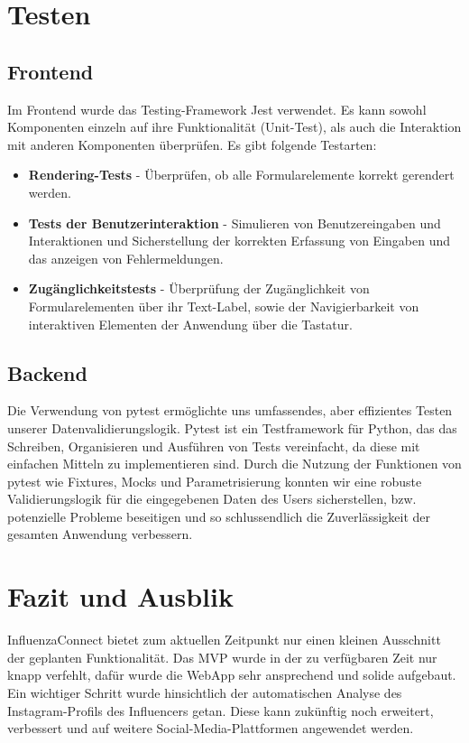\documentclass[conference,a4paper,flushend]{cs-techrep}
\begin{document}
\section{Testen}
\subsection{Frontend}
Im Frontend wurde das Testing-Framework Jest \cite{jest} verwendet. Es kann sowohl Komponenten einzeln auf ihre Funktionalität (Unit-Test), als auch die Interaktion mit anderen Komponenten überprüfen. Es gibt folgende Testarten:

\begin{itemize}
	\item{\textbf{Rendering-Tests} - Überprüfen, ob alle Formularelemente korrekt gerendert werden.}
	\item{\textbf{Tests der Benutzerinteraktion} - Simulieren von Benutzereingaben und Interaktionen und Sicherstellung der korrekten Erfassung von Eingaben und das anzeigen von Fehlermeldungen.}
	\item{\textbf{Zugänglichkeitstests} - Überprüfung der Zugänglichkeit von Formularelementen über ihr Text-Label, sowie der Navigierbarkeit von interaktiven Elementen der Anwendung über die Tastatur.}
\end{itemize}


\subsection{Backend}
Die Verwendung von pytest \cite{noauthor_pytest_nodate} ermöglichte uns umfassendes, aber effizientes Testen unserer Datenvalidierungslogik. Pytest ist ein Testframework für Python, das das Schreiben, Organisieren und Ausführen von Tests vereinfacht, da diese mit einfachen Mitteln zu implementieren sind. Durch die Nutzung der Funktionen von pytest wie Fixtures, Mocks und Parametrisierung konnten wir eine robuste Validierungslogik für die eingegebenen Daten des Users sicherstellen, bzw. potenzielle Probleme beseitigen und so schlussendlich die Zuverlässigkeit der gesamten Anwendung verbessern. 



\section{Fazit und Ausblik}
InfluenzaConnect bietet zum aktuellen Zeitpunkt nur einen kleinen Ausschnitt der geplanten Funktionalität. Das MVP wurde in der zu verfügbaren Zeit nur knapp verfehlt, dafür wurde die WebApp sehr ansprechend und solide aufgebaut. Ein wichtiger Schritt wurde hinsichtlich der automatischen Analyse des Instagram-Profils des Influencers getan. Diese kann zukünftig noch erweitert, verbessert und auf weitere Social-Media-Plattformen angewendet werden. 
\end{document}
